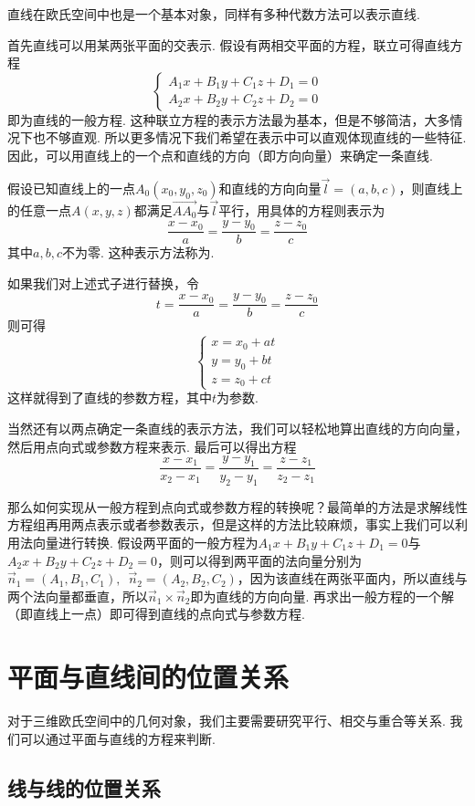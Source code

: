 直线在欧氏空间中也是一个基本对象，同样有多种代数方法可以表示直线.

首先直线可以用某两张平面的交表示. 假设有两相交平面的方程，联立可得直线方程
\[\begin{cases}
        A_1x+B_1y+C_1z+D_1=0 \\
        A_2x+B_2y+C_2z+D_2=0
    \end{cases}\]
即为直线的一般方程. 这种联立方程的表示方法最为基本，但是不够简洁，大多情况下也不够直观. 所以更多情况下我们希望在表示中可以直观体现直线的一些特征. 因此，可以用直线上的一个点和直线的方向（即方向向量）来确定一条直线.

假设已知直线上的一点$A_0(x_0,y_0,z_0)$和直线的方向向量$\vec{l}=(a,b,c)$，则直线上的任意一点$A(x,y,z)$都满足$\overrightarrow{AA_0}$与$\vec{l}$平行，用具体的方程则表示为
\[\frac{x-x_0}{a}=\frac{y-y_0}{b}=\frac{z-z_0}{c}\]
其中$a,b,c$不为零. 这种表示方法称为.

如果我们对上述式子进行替换，令\[t=\frac{x-x_0}{a}=\frac{y-y_0}{b}=\frac{z-z_0}{c}\]
则可得
\[\begin{cases}
        x=x_0+at \\
        y=y_0+bt \\
        z=z_0+ct
    \end{cases}\]
这样就得到了直线的参数方程，其中$t$为参数.

当然还有以两点确定一条直线的表示方法，我们可以轻松地算出直线的方向向量，然后用点向式或参数方程来表示. 最后可以得出方程
\[\frac{x-x_1}{x_2-x_1}=\frac{y-y_1}{y_2-y_1}=\frac{z-z_1}{z_2-z_1}\]

那么如何实现从一般方程到点向式或参数方程的转换呢？最简单的方法是求解线性方程组再用两点表示或者参数表示，但是这样的方法比较麻烦，事实上我们可以利用法向量进行转换. 假设两平面的一般方程为$A_1x+B_1y+C_1z+D_1=0$与$A_2x+B_2y+C_2z+D_2=0$，则可以得到两平面的法向量分别为$\vec{n}_1=(A_1,B_1,C_1),\enspace\vec{n}_2=(A_2,B_2,C_2)$，因为该直线在两张平面内，所以直线与两个法向量都垂直，所以$\vec{n}_1\times\vec{n}_2$即为直线的方向向量. 再求出一般方程的一个解（即直线上一点）即可得到直线的点向式与参数方程.

\section{平面与直线间的位置关系}

对于三维欧氏空间中的几何对象，我们主要需要研究平行、相交与重合等关系. 我们可以通过平面与直线的方程来判断.

\subsection{线与线的位置关系}

